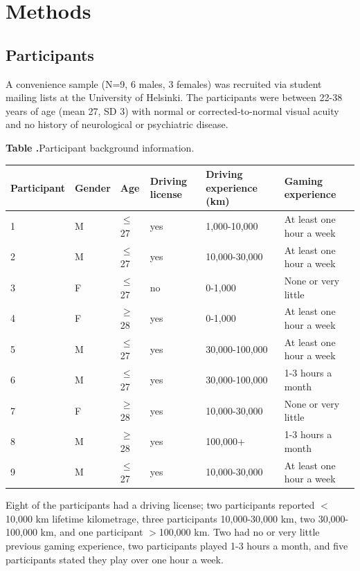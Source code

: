 \documentclass{frontierstyle/frontiersSCNS}
\begin{document}
\section{Methods}

\subsection{Participants}
A convenience sample (N=9, 6 males, 3 females) was recruited via student mailing lists at the University of Helsinki. The participants were between 22-38 years of age (mean 27, SD 3) with normal or corrected-to-normal visual acuity and no history of neurological or psychiatric disease.

\begin{table}[ht]
  \centering
  \textbf{\label{tab:Participants} Table .}{Participant background information.}
  \begin{tabular}{llllll}
  \hline
  Participant & Gender & Age & Driving license & Driving experience (km) & Gaming experience \\
  \hline
  1 & M & $\leq$27 & yes & 1,000-10,000 & At least one hour a week \\
  2 & M & $\leq$27 & yes & 10,000-30,000 & At least one hour a week \\
  3 & F & $\leq$27 & no & 0-1,000 & None or very little \\
  4 & F & $\geq$28 & yes & 0-1,000 & At least one hour a week \\
  5 & M & $\leq$27 & yes & 30,000-100,000 & At least one hour a week \\
  6 & M & $\leq$27 & yes & 30,000-100,000 & 1-3 hours a month \\
  7 & F & $\geq$28 & yes & 10,000-30,000 & None or very little \\
  8 & M & $\geq$28 & yes & 100,000+ & 1-3 hours a month \\
  9 & M & $\leq$27 & yes & 10,000-30,000 & At least one hour a week \\
  \hline
  \end{tabular}
\end{table}

Eight of the participants had a driving license; two participants reported $<$10,000 km lifetime kilometrage, three participants 10,000-30,000 km, two 30,000-100,000 km, and one participant $>$100,000 km. Two had no or very little previous gaming experience, two participants played 1-3 hours a month, and five participants stated they play over one hour a week.
\end{document}
